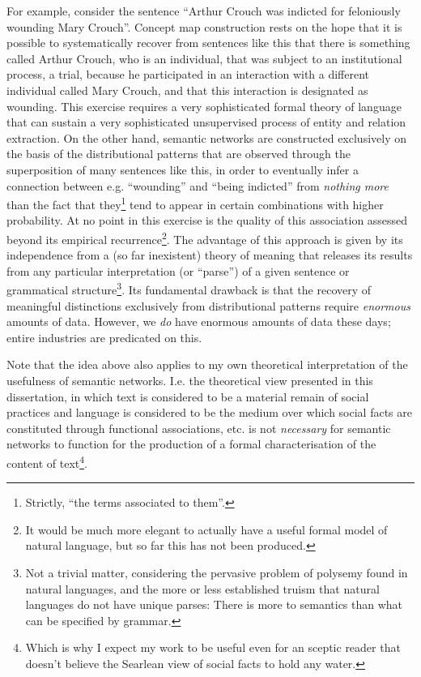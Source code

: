 For example, consider the sentence ``Arthur Crouch was indicted for feloniously wounding Mary Crouch''.
Concept map construction rests on the hope that it is possible to systematically recover from sentences like this that there is something called Arthur Crouch, who is an individual, that was subject to an institutional process, a trial, because he participated in an interaction with a different individual called Mary Crouch, and that this interaction is designated as wounding.
This exercise requires a very sophisticated formal theory of language that can sustain a very sophisticated unsupervised process of entity and relation extraction.
On the other hand, semantic networks are constructed exclusively on the basis of the distributional patterns that are observed through the superposition of many sentences like this, in order to eventually infer a connection between e.g. ``wounding'' and ``being indicted'' from \emph{nothing more} than the fact that they\footnote{
    Strictly, ``the terms associated to them''.
} tend to appear in certain combinations with higher probability.
At no point in this exercise is the quality of this association assessed beyond its empirical recurrence\footnote{
    It would be much more elegant to actually have a useful formal model of natural language, but so far this has not been produced.
}.
The advantage of this approach is given by its independence from a (so far inexistent) theory of meaning that releases its results from any particular interpretation (or ``parse'') of a given sentence or grammatical structure\footnote{
    Not a trivial matter, considering the pervasive problem of polysemy found in natural languages, and the more or less established truism that natural languages do not have unique parses:
    There is more to semantics than what can be specified by grammar.
}.
Its fundamental drawback is that the recovery of meaningful distinctions exclusively from distributional patterns require \emph{enormous} amounts of data.
However, we \emph{do} have enormous amounts of data these days; entire industries are predicated on this.

Note that the idea above also applies to my own theoretical interpretation of the usefulness of semantic networks.
I.e. the theoretical view presented in this dissertation, in which text is considered to be a material remain of social practices and language is considered to be the medium over which social facts are constituted through functional associations, etc. is not \emph{necessary} for semantic networks to function for the production of a formal characterisation of the content of text\footnote{
    Which is why I expect my work to be useful even for an sceptic reader that doesn't believe the Searlean view of social facts to hold any water.
}.

